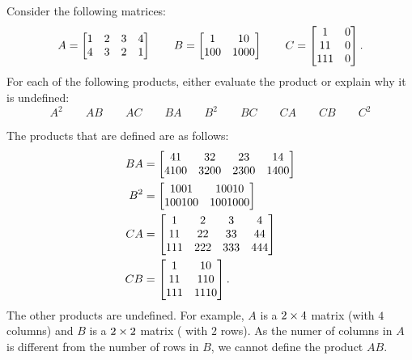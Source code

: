 \documentclass[a4paper]{amsart}
\renewenvironment{solution}{\SolutionInline}{\endSolutionInline}
\begin{document}
\begin{exercise}\label{ex-mat-prod-ii}
 Consider the following matrices:
 \[ A = \left[\begin{matrix} 1&2&3&4 \\ 4&3&2&1 \end{matrix}\right] \qquad
    B = \left[\begin{matrix} 1 & 10 \\ 100 & 1000 \end{matrix}\right] \qquad
    C = \left[\begin{matrix} 1 & 0 \\ 11 & 0 \\ 111 & 0 \end{matrix}\right].
 \]
 For each of the following products, either evaluate the product or
 explain why it is undefined:
 \[ A^2 \qquad AB \qquad AC \qquad
    BA \qquad B^2 \qquad BC \qquad
    CA \qquad CB \qquad C^2
 \]
\end{exercise}
\begin{solution}
 The products that are defined are as follows:
 \begin{align*}
  BA &= \left[\begin{matrix} 41 & 32 & 23 & 14 \\ 4100 & 3200 & 2300 & 1400 \end{matrix}\right] \\
  B^2 &= \left[\begin{matrix} 1001 & 10010 \\ 100100 & 1001000 \end{matrix}\right] \\
  CA &= \left[\begin{matrix} 1 & 2 & 3 & 4 \\
             11 & 22 & 33 & 44 \\
             111 & 222 & 333 & 444 \end{matrix}\right] \\
  CB &= \left[\begin{matrix} 1 & 10 \\ 11 & 110 \\ 111 & 1110 \end{matrix}\right].
 \end{align*}
 The other products are undefined.  For example, $A$ is a $2\times 4$
 matrix (with $4$ columns) and $B$ is a $2\times 2$ matrix ( with $2$
 rows).  As the numer of columns in $A$ is different from the number
 of rows in $B$, we cannot define the product $AB$.  
\end{solution}
\end{document}
